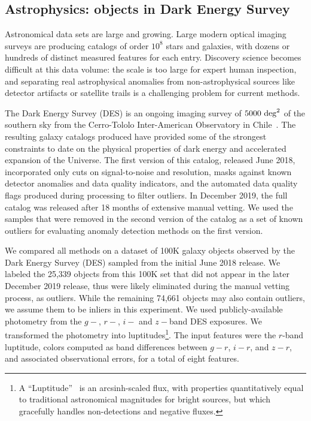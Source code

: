 \documentclass[utf8]{frontiersFPHY} %
\begin{document}
\subsection{Astrophysics: objects in Dark Energy Survey}
Astronomical data sets are large and growing. Large modern optical
imaging surveys are producing catalogs of order $10^8$ stars
and galaxies, with dozens or hundreds of distinct measured features
for each entry. Discovery science becomes difficult at this data
volume: the scale is too large for expert human inspection, and separating real
astrophysical anomalies from non-astrophysical sources like detector artifacts or
satellite trails is a challenging problem for current methods.

The Dark Energy Survey (DES) is an ongoing imaging survey of
$5000~{\rm deg}^2$ of the southern sky from the Cerro-Tololo
Inter-American Observatory in Chile~\cite{zuntz2018dark}. The resulting galaxy 
catalogs produced have provided some of the strongest constraints to date on
the physical properties of dark energy and accelerated expansion
of the Universe. The first version of this catalog, released June 2018, incorporated
only cuts on signal-to-noise and resolution, masks against known detector
anomalies and data quality indicators, and the automated data quality
flags produced during processing to filter outliers. 
In December 2019, the full catalog
was released after 18 months of extensive manual vetting. We used the samples 
that were removed in the second version of the catalog as a set of known
outliers for evaluating anomaly detection methods on the first version.

We compared all methods on a dataset of 100K galaxy objects
observed by the Dark Energy Survey (DES) sampled from the initial June 2018 release.
We labeled the 25,339 objects from this 100K set that did not appear in the 
later December 2019 release, thus were likely eliminated during the manual 
vetting process, as outliers.
While the remaining 74,661 objects may also contain outliers, we assume them 
to be inliers in this experiment. We used publicly-available photometry from 
the $g-$, $r-$, $i-$ and $z-$band DES exposures.  We
transformed the photometry into luptitudes\footnote{A
``Luptitude''~\cite{lupton99} is an arcsinh-scaled flux, with
properties quantitatively equal to
traditional astronomical magnitudes for bright sources, but which
gracefully handles non-detections and negative fluxes.}.  The input features 
were the $r$-band luptitude, colors computed as band differences between
$g-r$, $i-r$, and $z-r$, and associated observational errors, for a total of 
eight features.
%
\end{document}

